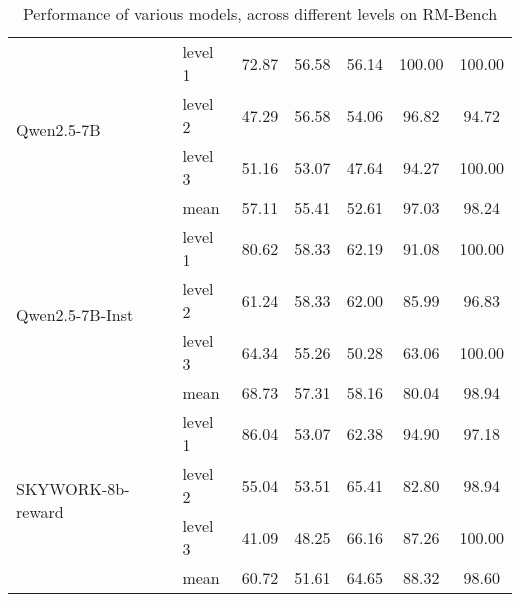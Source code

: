 \begin{table*}[h!]
\begin{tabular}{l|l|c|c|c|c|c}
 \multirow{4}{*}{Qwen2.5-7B} &  level 1 & 72.87 & 56.58 & 56.14 & 100.00 & 100.00 \\
& level 2 & 47.29 & 56.58 & 54.06 & 96.82 & 94.72 \\
&  level 3 & 51.16 & 53.07 & 47.64 & 94.27 & 100.00 \\
& mean & 57.11 & 55.41 & 52.61 & 97.03 & 98.24 \\
\hline
 \multirow{4}{*}{Qwen2.5-7B-Inst} &  level 1 & 80.62 & 58.33 & 62.19 & 91.08 & 100.00 \\
& level 2 & 61.24 & 58.33 & 62.00 & 85.99 & 96.83 \\
&  level 3 & 64.34 & 55.26 & 50.28 & 63.06 & 100.00 \\
& mean & 68.73 & 57.31 & 58.16 & 80.04 & 98.94 \\
\hline
 \multirow{4}{*}{SKYWORK-8b-reward} &  level 1 & 86.04 & 53.07 & 62.38 & 94.90 & 97.18 \\
& level 2 & 55.04 & 53.51 & 65.41 & 82.80 & 98.94 \\
&  level 3 & 41.09 & 48.25 & 66.16 & 87.26 & 100.00 \\
& mean & 60.72 & 51.61 & 64.65 & 88.32 & 98.60 \\
\hline


\end{tabular}
\caption{Performance of various models, across different levels on RM-Bench}
\label{tab:rm_bench_levels}
\end{table*}